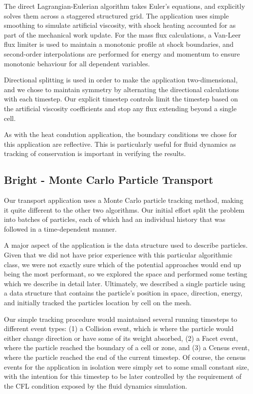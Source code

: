 \documentclass[runningheads,a4paper]{llncs}
\begin{document}
The direct Lagrangian-Eulerian algorithm takes Euler's equations, and explicitly solves them across a staggered structured grid. The application uses simple smoothing to simulate artificial viscosity, with shock heating accounted for as part of the mechanical work update. For the mass flux calculations, a Van-Leer flux limiter is used to maintain a monotonic profile at shock boundaries, and second-order interpolations are performed for energy and momentum to ensure monotonic behaviour for all dependent variables.

Directional splitting is used in order to make the application two-dimensional, and we chose to maintain symmetry by alternating the directional calculations with each timestep. Our explicit timestep controls limit the timestep based on the artificial viscosity coefficients and stop any flux extending beyond a single cell.

As with the heat condution application, the boundary conditions we chose for this application are reflective. This is particularly useful for fluid dynamics as tracking of conservation is important in verifying the results.

\subsection{Bright - Monte Carlo Particle Transport}

Our transport application uses a Monte Carlo particle tracking method, making it quite different to the other two algorithms. Our initial effort split the problem into batches of particles, each of which had an individual history that was followed in a time-dependent manner. 

A major aspect of the application is the data structure used to describe particles. Given that we did not have prior experience with this particular algorithmic class, we were not exactly sure which of the potential approaches would end up being the most performant, so we explored the space and performed some testing which we describe in detail later. Ultimately, we described a single particle using a data structure that contains the particle's position in space, direction, energy, and initially tracked the particles location by cell on the mesh.

Our simple tracking procedure would maintained several running timesteps to different event types: (1) a Collision event, which is where the particle would either change direction or have some of its weight absorbed, (2) a Facet event, where the particle reached the boundary of a cell or zone, and (3) a Census event, where the particle reached the end of the current timestep. Of course, the census events for the application in isolation were simply set to some small constant size, with the intention for this timestep to be later controlled by the requirement of the CFL condition exposed by the fluid dynamics simulation.
\end{document}
